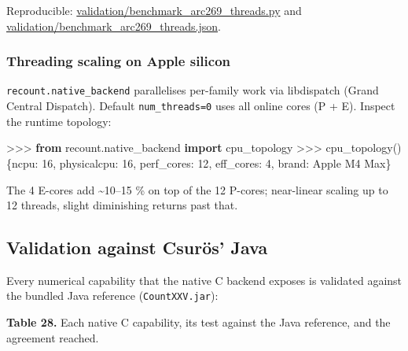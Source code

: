 \documentclass[
  10pt,
]{article}
\newenvironment{Shaded}{}{}
\newcommand{\DecValTok}[1]{\textcolor[rgb]{0.25,0.63,0.44}{#1}}
\newcommand{\ImportTok}[1]{\textcolor[rgb]{0.00,0.50,0.00}{\textbf{#1}}}
\newcommand{\NormalTok}[1]{#1}
\newcommand{\OperatorTok}[1]{\textcolor[rgb]{0.40,0.40,0.40}{#1}}
\newcommand{\StringTok}[1]{\textcolor[rgb]{0.25,0.44,0.63}{#1}}
\begin{document}
Reproducible: \url{validation/benchmark_arc269_threads.py} and
\url{validation/benchmark_arc269_threads.json}.

\subsubsection{Threading scaling on Apple
silicon}\label{threading-scaling-on-apple-silicon}

\texttt{recount.native\_backend} parallelises per-family work via
libdispatch (Grand Central Dispatch). Default \texttt{num\_threads=0}
uses all online cores (P + E). Inspect the runtime topology:

\begin{Shaded}
\begin{Highlighting}[]
\OperatorTok{\textgreater{}\textgreater{}\textgreater{}} \ImportTok{from}\NormalTok{ recount.native\_backend }\ImportTok{import}\NormalTok{ cpu\_topology}
\OperatorTok{\textgreater{}\textgreater{}\textgreater{}}\NormalTok{ cpu\_topology()}
\NormalTok{\{}\StringTok{\textquotesingle{}ncpu\textquotesingle{}}\NormalTok{: }\DecValTok{16}\NormalTok{, }\StringTok{\textquotesingle{}physicalcpu\textquotesingle{}}\NormalTok{: }\DecValTok{16}\NormalTok{, }\StringTok{\textquotesingle{}perf\_cores\textquotesingle{}}\NormalTok{: }\DecValTok{12}\NormalTok{, }\StringTok{\textquotesingle{}eff\_cores\textquotesingle{}}\NormalTok{: }\DecValTok{4}\NormalTok{,}
 \StringTok{\textquotesingle{}brand\textquotesingle{}}\NormalTok{: }\StringTok{\textquotesingle{}Apple M4 Max\textquotesingle{}}\NormalTok{\}}
\end{Highlighting}
\end{Shaded}

The 4 E-cores add \textasciitilde10--15 \% on top of the 12 P-cores;
near-linear scaling up to 12 threads, slight diminishing returns past
that.

\subsection{Validation against Csurös'
Java}\label{validation-against-csuruxf6s-java}

Every numerical capability that the native C backend exposes is
validated against the bundled Java reference (\texttt{CountXXV.jar}):

\textbf{Table 28.} Each native C capability, its test against the Java
reference, and the agreement reached.
\end{document}
